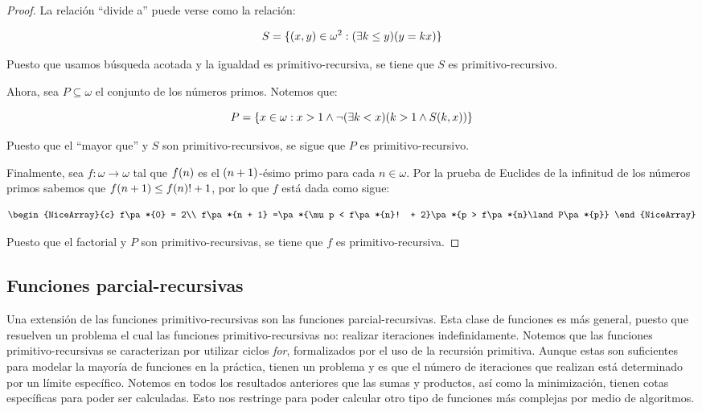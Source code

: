 \begin{proof}
	La relación ``divide a'' puede verse como la relación:

	\[
		S =\{\pa*{x, y}\in\omega^{2}:\pa*{\exists k\leq y}\pa*{y = kx}\}
	\]

	Puesto que usamos búsqueda acotada y la igualdad es primitivo-recursiva, se tiene que $S$ es primitivo-recursivo.

	Ahora, sea $P\subseteq\omega$ el conjunto de los números primos. Notemos que:

	\[
		P =\{x\in\omega: x > 1\land\neg\pa*{\exists k < x}\pa*{k > 1\land S\pa*{k, x}}\}
	\]

	Puesto que el ``mayor que'' y $S$ son primitivo-recursivos, se sigue que $P$ es primitivo-recursivo.

	Finalmente, sea $f:\omega\to\omega$ tal que $f\pa*{n}$ es el $\pa*{n + 1}$-ésimo primo para cada $n\in\omega$. Por la prueba de Euclides de la infinitud de los números primos sabemos que $f\pa*{n + 1}\leq f\pa*{n}! + 1$, por lo que $f$ está dada como sigue:

	\[
		\begin{NiceArray}{c}
			f\pa*{0} = 2\\
			f\pa*{n + 1} =\pa*{\mu p < f\pa*{n}! + 2}\pa*{p > f\pa*{n}\land P\pa*{p}}
		\end{NiceArray}
	\]

	Puesto que el factorial y $P$ son primitivo-recursivas, se tiene que $f$ es primitivo-recursiva.
\end{proof}

\subsection{Funciones parcial-recursivas}

Una extensión de las funciones primitivo-recursivas son las funciones parcial-recursivas. Esta clase de funciones es más general, puesto que resuelven un problema el cual las funciones primitivo-recursivas no: realizar iteraciones indefinidamente. Notemos que las funciones primitivo-recursivas se caracterizan por utilizar ciclos \emph{for}, formalizados por el uso de la recursión primitiva. Aunque estas son suficientes para modelar la mayoría de funciones en la práctica, tienen un problema y es que el número de iteraciones que realizan está determinado por un límite específico. Notemos en todos los resultados anteriores que las sumas y productos, así como la minimización, tienen cotas específicas para poder ser calculadas. Esto nos restringe para poder calcular otro tipo de funciones más complejas por medio de algoritmos.

